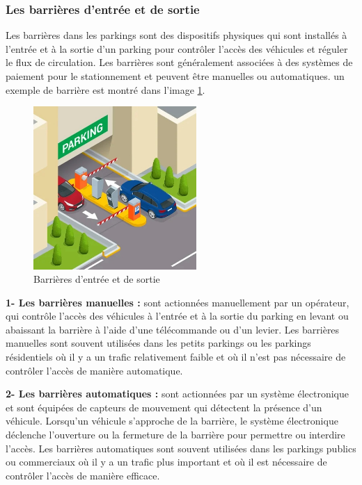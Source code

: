 \subsubsection{ Les barrières d'entrée et de sortie}
Les barrières dans les parkings sont des dispositifs physiques qui sont installés à l'entrée et à la sortie d'un parking pour contrôler l'accès des véhicules et réguler le flux de circulation. Les barrières sont généralement associées à des systèmes de paiement pour le stationnement et peuvent être manuelles ou automatiques. un exemple de barrière est montré dans l'image \ref{ch1barrier}.

\begin{figure}[H]
	\centering
	\includegraphics[height=06.2cm]{img/ch1-barrier-01.jpg}
	\caption{ Barrières d'entrée et de sortie}
  \label{ch1barrier}
\end{figure}

\textbf{1- Les barrières manuelles : } sont actionnées manuellement par un opérateur, qui contrôle l'accès des véhicules à l'entrée et à la sortie du parking en levant ou abaissant la barrière à l'aide d'une télécommande ou d'un levier. Les barrières manuelles sont souvent utilisées dans les petits parkings ou les parkings résidentiels où il y a un trafic relativement faible et où il n'est pas nécessaire de contrôler l'accès de manière automatique.

\textbf{2- Les barrières automatiques : } sont actionnées par un système électronique et sont équipées de capteurs de mouvement qui détectent la présence d'un véhicule. Lorsqu'un véhicule s'approche de la barrière, le système électronique déclenche l'ouverture ou la fermeture de la barrière pour permettre ou interdire l'accès. Les barrières automatiques sont souvent utilisées dans les parkings publics ou commerciaux où il y a un trafic plus important et où il est nécessaire de contrôler l'accès de manière efficace.

